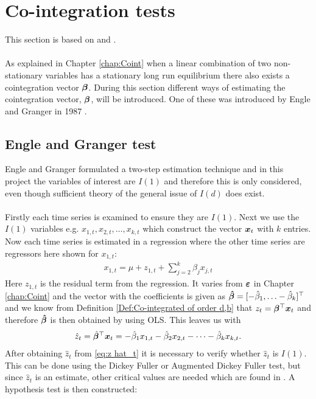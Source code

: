 \chapter{Co-integration tests}
This section is based on \cite{Analysis_of_integrated_and_cointegrated_time_series_with_R} and \cite{Engle_grang_test}.\\\\
\noindent As explained in Chapter \ref{chap:Coint} when a linear combination of two non-stationary variables has a stationary long run equilibrium there also exists a cointegration vector $\boldsymbol{\beta}$. During this section different ways of estimating the cointegration vector, $\boldsymbol{\beta}$, will be introduced. One of these was introduced by Engle and Granger in 1987 \cite{co-Integration_and_error_correction}.
\section{Engle and Granger test}
Engle and Granger formulated a two-step estimation technique and in this project the variables of interest are $I(1)$ and therefore this is only considered, even though sufficient theory of the general issue of $I(d)$ does exist. \\\\ 
Firstly each time series is examined to ensure they are $I(1)$. Next we use the $I(1)$ variables e.g. $x_{1,t},x_{2,t},\ldots,x_{k,t}$ which construct the vector $\boldsymbol{x}_t$ with $k$ entries. Now each time series is estimated in a regression where the other time series are regressors here shown for $x_{1,t}$:
\begin{align*}
    x_{1,t}=\mu+z_{1,t}+\sum^k_{j=2}\beta_j x_{j,t}
\end{align*}
Here $z_{1,t}$ is the residual term from the regression. It varies from $\boldsymbol{\varepsilon}$ in Chapter \ref{chap:Coint} and the vector with the coefficients is given as $\boldsymbol{\hat{\beta}}=[-\hat{\beta}_1,\ldots-\hat{\beta}_k]^\top$ and we know from Definition \ref{Def:Co-integrated of order d,b} that $z_t=\boldsymbol{\beta}^\top \boldsymbol{x}_t$ and therefore $\boldsymbol{\hat{\beta}}$ is then obtained by using OLS. This leaves us with
\begin{align}\label{eq:z hat_t}
\hat{z}_t=\hat{\boldsymbol{\beta}}^\top \boldsymbol{x}_t=-\hat{\beta}_{1}x_{1,t}-\hat{\beta}_{2}x_{2,t}-\cdots-\hat{\beta}_{k}x_{k,t}.
\end{align}
After obtaining $\hat{z}_t$ from \eqref{eq:z hat_t} it is necessary to verify whether $\hat{z}_t$ is $I(1)$. This can be done using the Dickey Fuller or Augmented Dickey Fuller test, but since $\hat{z}_t$ is an estimate, other critical values are needed which are found in \cite{ENGLE1987143}. A hypothesis test is then constructed:
